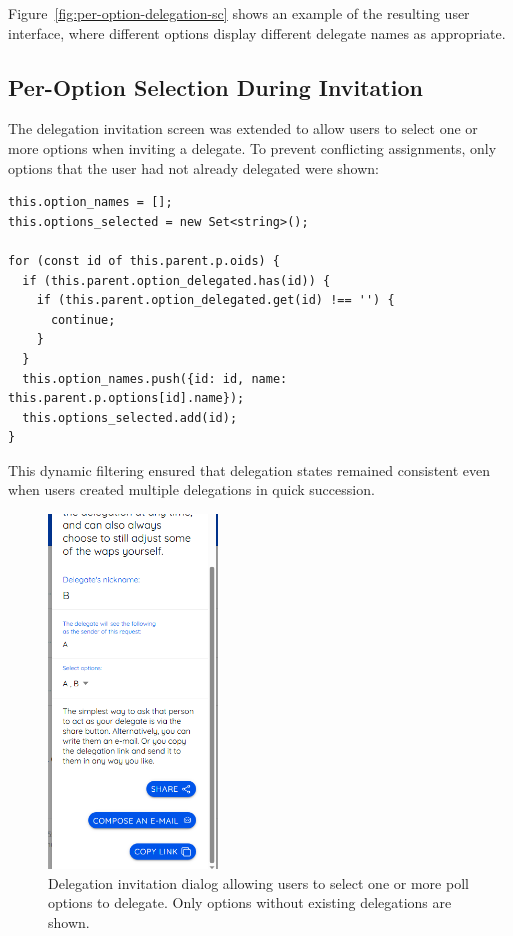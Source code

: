 Figure~\ref{fig:per-option-delegation-sc} shows an example of the resulting user interface, where different options display different delegate names as appropriate.

\subsection{Per-Option Selection During Invitation}

The delegation invitation screen was extended to allow users to select one or more options when inviting a delegate. To prevent conflicting assignments, only options that the user had not already delegated were shown:

\begin{verbatim}
this.option_names = [];
this.options_selected = new Set<string>();

for (const id of this.parent.p.oids) {
  if (this.parent.option_delegated.has(id)) {
    if (this.parent.option_delegated.get(id) !== '') {
      continue;
    }
  }
  this.option_names.push({id: id, name: this.parent.p.options[id].name});
  this.options_selected.add(id);
}
\end{verbatim}

This dynamic filtering ensured that delegation states remained consistent even when users created multiple delegations in quick succession.

\begin{figure}[H]
  \centering
  \includegraphics[width=0.4\textwidth]{../common/peroption/invite.png}
  \caption{Delegation invitation dialog allowing users to select one or more poll options to delegate. Only options without existing delegations are shown.}
  \label{fig:per-option-delegation-invite}
\end{figure}

